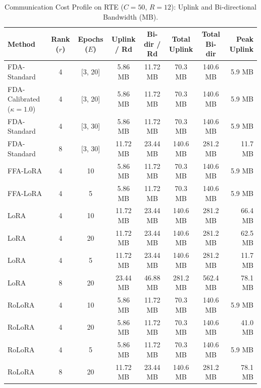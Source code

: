 \documentclass[10pt,a4paper]{article}
\begin{document}
\begin{table}[H]
\centering
\caption{Communication Cost Profile on RTE ($C=50$, $R=12$): Uplink and Bi-directional Bandwidth (MB).}
\scriptsize
\setlength{\tabcolsep}{4.0pt}
\begin{tabular*}{\textwidth}{@{\extracolsep{\fill}}lccccccr@{}}
\toprule
\textbf{Method} & \textbf{Rank ($r$)} & \textbf{Epochs ($E$)} & \textbf{Uplink / Rd} & \textbf{Bi-dir / Rd} & \textbf{Total Uplink} & \textbf{Total Bi-dir} & \textbf{Peak Uplink} \\
\midrule
FDA-Standard & 4 & [3, 20] & 5.86 MB & 11.72 MB & 70.3 MB & 140.6 MB & 5.9 MB \\
FDA-Calibrated ($\kappa=1.0$) & 4 & [3, 20] & 5.86 MB & 11.72 MB & 70.3 MB & 140.6 MB & 5.9 MB \\
FDA-Standard & 4 & [3, 30] & 5.86 MB & 11.72 MB & 70.3 MB & 140.6 MB & 5.9 MB \\
FDA-Standard & 8 & [3, 30] & 11.72 MB & 23.44 MB & 140.6 MB & 281.2 MB & 11.7 MB \\
FFA-LoRA & 4 & 10 & 5.86 MB & 11.72 MB & 70.3 MB & 140.6 MB & 5.9 MB \\
FFA-LoRA & 4 & 5 & 5.86 MB & 11.72 MB & 70.3 MB & 140.6 MB & 5.9 MB \\
LoRA & 4 & 10 & 11.72 MB & 23.44 MB & 140.6 MB & 281.2 MB & 66.4 MB \\
LoRA & 4 & 20 & 11.72 MB & 23.44 MB & 140.6 MB & 281.2 MB & 62.5 MB \\
LoRA & 4 & 5 & 11.72 MB & 23.44 MB & 140.6 MB & 281.2 MB & 11.7 MB \\
LoRA & 8 & 20 & 23.44 MB & 46.88 MB & 281.2 MB & 562.4 MB & 78.1 MB \\
RoLoRA & 4 & 10 & 5.86 MB & 11.72 MB & 70.3 MB & 140.6 MB & 5.9 MB \\
RoLoRA & 4 & 20 & 5.86 MB & 11.72 MB & 70.3 MB & 140.6 MB & 41.0 MB \\
RoLoRA & 4 & 5 & 5.86 MB & 11.72 MB & 70.3 MB & 140.6 MB & 5.9 MB \\
RoLoRA & 8 & 20 & 11.72 MB & 23.44 MB & 140.6 MB & 281.2 MB & 78.1 MB \\
\bottomrule
\end{tabular*}
\end{table}
\end{document}
